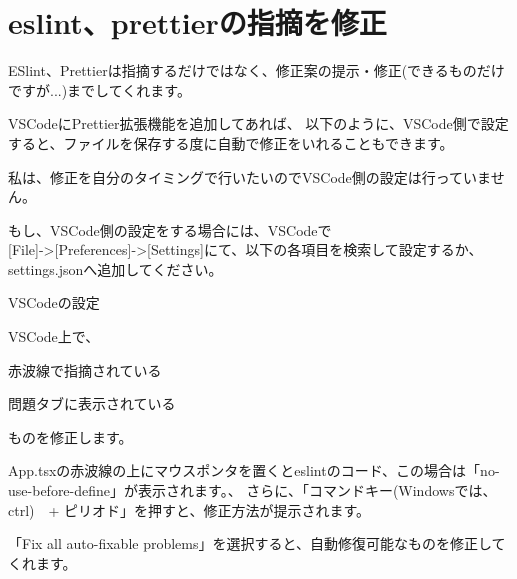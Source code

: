 \section{eslint、prettierの指摘を修正}
\keeplastskip{
  \label{sec:2-5}
  \label{sec-04fix}
  \par\nobreak
}

ESlint、Prettierは指摘するだけではなく、修正案の提示・修正(できるものだけですが...)までしてくれます。

VSCodeにPrettier拡張機能を追加してあれば、
以下のように、VSCode側で設定すると、ファイルを保存する度に自動で修正をいれることもできます。

私は、修正を自分のタイミングで行いたいのでVSCode側の設定は行っていません。

もし、VSCode側の設定をする場合には、VSCodeで\\[0pt]
[File]{-}\textgreater{}[Preferences]{-}\textgreater{}[Settings]にて、以下の各項目を検索して設定するか、settings.jsonへ追加してください。

\def\startercodeblockfontsize{}
\begin{starterprogram}[]{VSCodeの設定}\end{starterprogram}

VSCode上で、\\[0pt]

\begin{starteritemize}
\item 赤波線で指摘されている
\item 問題タブに表示されている
\end{starteritemize}

ものを修正します。

App.tsxの赤波線の上にマウスポンタを置くとeslintのコード、この場合は「no{-}use{-}before{-}define」が表示されます。、
さらに、「コマンドキー(Windowsでは、ctrl)　+ ピリオド」を押すと、修正方法が提示されます。

「Fix all auto{-}fixable problems」を選択すると、自動修復可能なものを修正してくれます。

